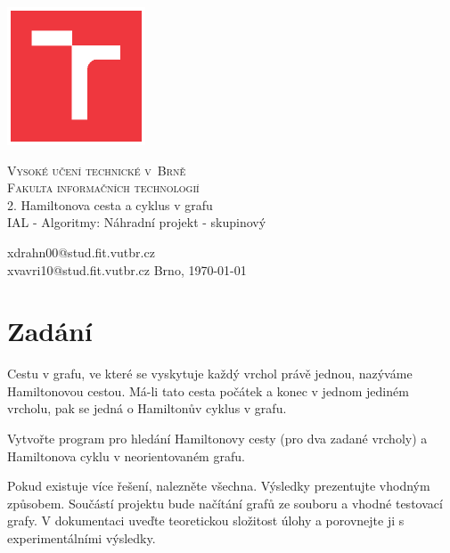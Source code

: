 \documentclass[a4paper,11pt]{article}
\begin{document}
\begin{titlepage}

	\begin{center}

        \includegraphics[width=4.1cm,keepaspectratio,trim={1.2cm 1.2cm 1.2cm 1.2cm},clip]{./template-fig/VUT_symbol_barevne_CMYK_CZ}%

		{\Huge\textsc{Vysoké učení technické v~Brně}}\\
		\medskip
		{\huge\textsc{Fakulta informačních technologií}}\\
		{\huge 2. Hamiltonova cesta a cyklus v grafu}\\
		\medskip
		{\LARGE IAL - Algoritmy: Náhradní projekt - skupinový}\\
	\end{center}

    \noindent xdrahn00@stud.fit.vutbr.cz\\ xvavri10@stud.fit.vutbr.cz \Large {\hfill Brno, \today}

\end{titlepage}

\section{Zadání}

Cestu v grafu, ve které se vyskytuje každý vrchol právě jednou, nazýváme Hamiltonovou cestou. Má-li tato cesta počátek a konec v jednom jediném vrcholu, pak se jedná o Hamiltonův cyklus v grafu. 

Vytvořte program pro hledání Hamiltonovy cesty (pro dva zadané vrcholy) a Hamiltonova cyklu v neorientovaném grafu. 

Pokud existuje více řešení, nalezněte všechna. Výsledky prezentujte vhodným způsobem. Součástí projektu bude načítání grafů ze souboru a vhodné testovací grafy. V dokumentaci uveďte teoretickou složitost úlohy a porovnejte ji s experimentálními výsledky.
\end{document}
